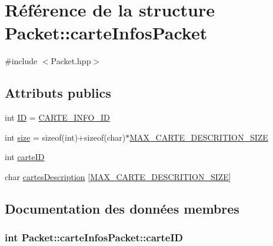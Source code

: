 \hypertarget{structPacket_1_1carteInfosPacket}{}\section{Référence de la structure Packet\+:\+:carte\+Infos\+Packet}
\label{structPacket_1_1carteInfosPacket}


{\ttfamily \#include $<$Packet.\+hpp$>$}

\subsection*{Attributs publics}
\begin{DoxyCompactItemize}
\item 
int \hyperlink{structPacket_1_1carteInfosPacket_aa385cf584f070650fa90455a9e4d9f90}{I\+D} = \hyperlink{classPacket_ae91c1d355e4c8f0bef5f893747473661aa61d9c1d39512a3a4054cbfc15a60b48}{C\+A\+R\+T\+E\+\_\+\+I\+N\+F\+O\+\_\+\+I\+D}
\item 
int \hyperlink{structPacket_1_1carteInfosPacket_a5b1c8a614c8dcfa1d01d59210bab4d85}{size} = sizeof(int)+sizeof(char)$\ast$\hyperlink{Packet_8hpp_a1de6746763761071cb33e1fbbe574f62}{M\+A\+X\+\_\+\+C\+A\+R\+T\+E\+\_\+\+D\+E\+S\+C\+R\+I\+T\+I\+O\+N\+\_\+\+S\+I\+Z\+E}
\item 
int \hyperlink{structPacket_1_1carteInfosPacket_ac936145974d445b5476f4dec4583498f}{carte\+I\+D}
\item 
char \hyperlink{structPacket_1_1carteInfosPacket_a3b02e4ea49980ee77d5882fcf5f258ba}{cartes\+Description} \mbox{[}\hyperlink{Packet_8hpp_a1de6746763761071cb33e1fbbe574f62}{M\+A\+X\+\_\+\+C\+A\+R\+T\+E\+\_\+\+D\+E\+S\+C\+R\+I\+T\+I\+O\+N\+\_\+\+S\+I\+Z\+E}\mbox{]}
\end{DoxyCompactItemize}


\subsection{Documentation des données membres}
\hypertarget{structPacket_1_1carteInfosPacket_ac936145974d445b5476f4dec4583498f}{}
\subsubsection[{carte\+I\+D}]{\setlength{\rightskip}{0pt plus 5cm}int Packet\+::carte\+Infos\+Packet\+::carte\+I\+D}\label{structPacket_1_1carteInfosPacket_ac936145974d445b5476f4dec4583498f}
\hypertarget{structPacket_1_1carteInfosPacket_a3b02e4ea49980ee77d5882fcf5f258ba}{}
